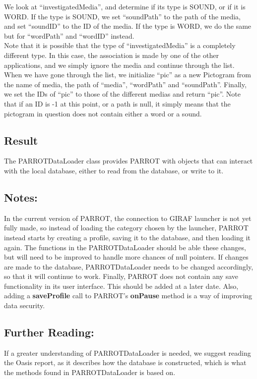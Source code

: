 We look at ``investigatedMedia'', and determine if its type is SOUND, or if it is WORD.
If the type is SOUND, we set ``soundPath'' to the path of the media, and set ``soundID'' to the ID of the media.
If the type is WORD, we do the same but for ``wordPath'' and ``wordID'' instead.\\
Note that it is possible that the type of ``investigatedMedia'' is a completely different type. In this case, the association is made by one of the other applications, and we simply ignore the media and continue through the list.\\
When we have gone through the list, we initialize ``pic'' as a new Pictogram from the name of media, the path of ``media'', ``wordPath'' and ``soundPath''.
Finally, we set the IDs of ``pic'' to those of the different medias and return ``pic''.\newline
Note that if an ID is -1 at this point, or a path is null, it simply means that the pictogram in question does not contain either a word or a sound.

\subsection*{Result}
The PARROTDataLoader class provides PARROT with objects that can interact with the local database, either to read from the database, or write to it.

\subsection*{Notes:}
In the current version of PARROT, the connection to GIRAF launcher is not yet fully made, so instead of loading the category chosen by the launcher, PARROT instead starts by creating a profile, saving it to the database, and then loading it again.
The functions in the PARROTDataLoader should be able these changes, but will need to be improved to handle more chances of null pointers.\newline
If changes are made to the database, PARROTDataLoader needs to be changed accordingly, so that it will continue to work.\newline
Finally, PARROT does not contain any save functionality in its user interface.
This should be added at a later date.
Also, adding a \textbf{saveProfile} call to PARROT's \textbf{onPause} method is a way of improving data security.

\subsection*{Further Reading:}
If a greater understanding of PARROTDataLoader is needed, we suggest reading the Oasis report, as it describes how the database is constructed, which is what the methods found in PARROTDataLoader is based on.